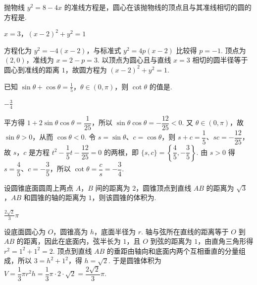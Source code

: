 \begin{problem}
抛物线 \(y^{2} = 8 - 4x \) 的准线方程是\fillinblank{}，圆心在该抛物线的顶点且与其准线相切的圆的方程是\fillinblank{}.
\end{problem}

\begin{answer}
\(x=3\)，\(\left(x-2\right)^2+y^2=1\)
\end{answer}

\begin{solution}
方程化为 \(y^2=-4(x-2)\)，与标准式 \(y^2=4p(x-2)\) 比较得 \(p=-1\). 顶点为 \((2,0)\)，准线为 \(x=2-p=3\). 以顶点为圆心且与直线 \(x=3\) 相切的圆半径等于圆心到准线的距离 \(1\)，故圆方程为 \((x-2)^2+y^2=1\).
\end{solution}

\begin{problem}
已知 \(\sin \theta + \cos \theta = \frac{1}{5}\)，\(\theta \in (0, \pi)\)，则 \(\cot \theta\) 的值是\fillinblank{}.
\end{problem}

\begin{answer}
\(-\frac{3}{4}\)
\end{answer}

\begin{solution}
平方得 \(1+2\sin\theta\cos\theta=\dfrac1{25}\)，所以 \(\sin\theta\cos\theta=-\dfrac{12}{25}<0\). 又 \(\theta\in(0,\pi)\)，故 \(\sin\theta>0\)，从而 \(\cos\theta<0\). 令 \(s=\sin\theta\)、\(c=\cos\theta\)，则 \(s+c=\dfrac15\)、\(sc=-\dfrac{12}{25}\)，故 \(s\)，\(c\) 是方程 \(t^2-\dfrac15t-\dfrac{12}{25}=0\) 的两根，即 \(\{s,c\}=\left\{\dfrac45,-\dfrac35\right\}\). 由 \(s>0\) 得 \(s=\dfrac45\)、\(c=-\dfrac35\)，所以 \(\cot\theta=\dfrac c s=-\dfrac34\).
\end{solution}

\begin{problem}
设圆锥底面圆周上两点 \(A\)，\(B\) 间的距离为 \(2\)，圆锥顶点到直线 \(AB\) 的距离为 \(\sqrt{3}\)，\(AB\) 和圆锥的轴的距离为 \(1\)，则该圆锥的体积为\fillinblank{}.
\end{problem}

\begin{answer}
\(\frac{2\sqrt{2}}{3}\pi\)
\end{answer}

\begin{solution}
设底面圆心为 \(O\)，圆锥高为 \(h\)，底面半径为 \(r\). 轴与弦所在直线的距离等于 \(O\) 到 \(AB\) 的距离，因此在底面内，弦半长为 \(1\)，且 \(O\) 到弦的距离为 \(1\)，由直角三角形得 \(r^2=1^2+1^2=2\). 顶点到直线 \(AB\) 的垂距由轴向和底面内两个互相垂直的分量组成，所以 \(3=h^2+1^2\)，得 \(h=\sqrt2\). 于是圆锥体积为 \(V=\dfrac13\pi r^2h=\dfrac13\pi\cdot2\cdot\sqrt2=\dfrac{2\sqrt2}{3}\pi\).
\end{solution}

